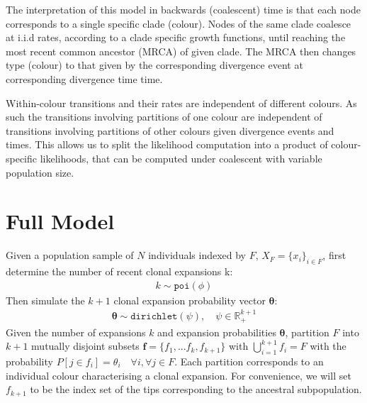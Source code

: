 \documentclass{report}
\newcommand{\R}{\mathbb{R}}
\theoremstyle{definition}
\begin{document}
The interpretation of this model in backwards (coalescent) time is that each node corresponds to a single specific clade (colour). Nodes of the same clade coalesce at i.i.d rates, according to a clade specific growth functions, until reaching the most recent common ancestor (MRCA) of given clade. The MRCA then changes type (colour) to that given by the corresponding divergence event at corresponding divergence time time. 

Within-colour transitions and their rates are independent of different colours. As such the transitions involving partitions of one colour  are independent of transitions involving partitions of other colours given divergence events and times. This allows us to split the likelihood computation into a product of colour-specific likelihoods, that can be computed under coalescent with variable population size.\\

\section{Full Model}
Given a population sample of $N$ individuals indexed by $F$, $X_F = \{x_i\}_{i \in F}$, first determine the number of recent clonal expansions k:
\begin{gather}
k \sim \texttt{poi}(\phi)
\end{gather}
Then simulate the $k+1$ clonal expansion probability vector $\pmb{\theta}$:
\begin{gather}
\pmb{\theta} \sim \texttt{dirichlet}(\psi), \quad \psi \in \R_+^{k+1} 
\end{gather}
Given the number of expansions $k$ and expansion probabilities $\pmb{\theta}$, partition $F$ into $k+1$ mutually disjoint subsets $\mathbf{f}=\{f_1, ... f_k, f_{k+1}\}$ with $\bigcup\limits_{i=1}^{k+1} f_{i} = F$ with the probability $P[j\in f_{i}]=\theta_i\quad \forall i,\forall j \in F$.  
Each partition corresponds to an individual colour characterising a clonal expansion. For convenience, we will set $f_{k+1}$ to be the index set of the tips corresponding to the ancestral subpopulation.
\end{document}
